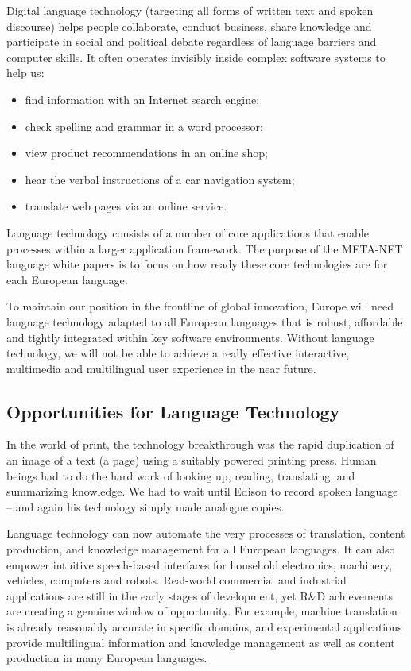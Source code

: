 \begin{multicols}{2}
\begin{itemize}
\begin{multicols}{2}
    Digital language technology (targeting all forms of written text and spoken discourse) helps people collaborate, conduct business, share knowledge and participate in social and political debate regardless of language barriers and computer skills. It often operates invisibly inside complex software systems to help us:
    \begin{itemize}
      \item find information with an Internet search engine;
      \item check spelling and grammar in a word processor;
      \item view product recommendations in an online shop;
      \item hear the verbal instructions of a car navigation system;
      \item translate web pages via an online service.
    \end{itemize}
    Language technology consists of a number of core applications that enable processes within a larger application framework. The purpose of the META-NET language white papers is to focus on how ready these core technologies are for each European language. 


    To maintain our position in the frontline of global innovation, Europe will need language technology adapted to all European languages that is robust, affordable and tightly integrated within key software environments. Without language technology, we will not be able to achieve a really effective interactive, multimedia and multilingual user experience in the near future.

\subsection{Opportunities for Language Technology}


    In the world of print, the technology breakthrough was the rapid duplication of an image of a text (a page) using a suitably powered printing press. Human beings had to do the hard work of looking up, reading, translating, and summarizing knowledge. We had to wait until Edison to record spoken language – and again his technology simply made analogue copies.

    Language technology can now automate the very processes of translation, content production, and knowledge management for all European languages. It can also empower intuitive speech-based interfaces for household electronics, machinery, vehicles, computers and robots. Real-world commercial and industrial applications are still in the early stages of development, yet R\&D achievements are creating a genuine window of opportunity. For example, machine translation is already reasonably accurate in specific domains, and experimental applications provide multilingual information and knowledge management as well as content production in many European languages. 


\end{multicols}
\end{itemize}
\end{multicols}
